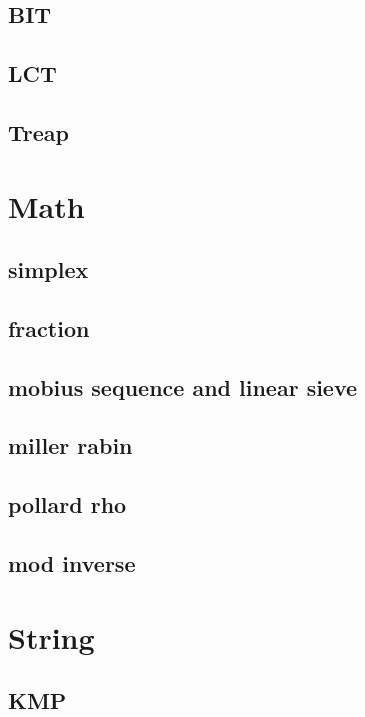 \documentclass[a4paper,10pt,twocolumn,oneside]{article}
\begin{document}
\subsection{BIT}

\subsection{LCT}

\subsection{Treap}


\section{Math}
\subsection{simplex}

\subsection{fraction}

\subsection{mobius sequence and linear sieve}

\subsection{miller rabin}

\subsection{pollard rho}

\subsection{mod inverse}


\section{String}
\subsection{KMP}

\end{document}
